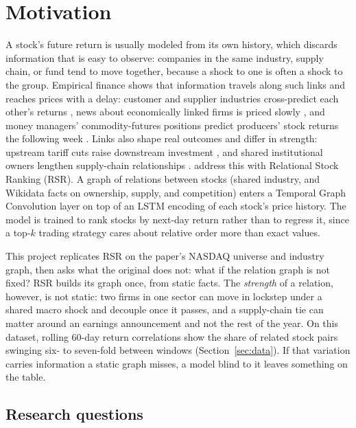 \documentclass[12pt]{article}
\begin{document}
\newpage
\clearpage


\section{Motivation}
\label{sec:motivation}

A stock's future return is usually modeled from its own history, which discards information that
is easy to observe: companies in the same industry, supply chain, or fund tend to move together,
because a shock to one is often a shock to the group. Empirical finance shows that information
travels along such links and reaches prices with a delay: customer and supplier industries
cross-predict each other's returns \citep{menzly2010market}, news about economically linked firms
is priced slowly \citep{cohen2008economic}, and money managers' commodity-futures positions predict
producers' stock returns the following week \citep{ho2023smart}. Links also shape real outcomes and
differ in strength: upstream tariff cuts raise downstream investment
\citep{martin2024downstream}, and shared institutional owners lengthen supply-chain relationships
\citep{freeman2025overlapping}. \citet{feng2019temporal} address this with
Relational Stock Ranking (RSR). A graph of relations between stocks (shared industry, and
Wikidata facts on ownership, supply, and competition) enters a Temporal Graph Convolution layer on
top of an LSTM encoding of each stock's price history. The model is trained to rank stocks by
next-day return rather than to regress it, since a top-$k$ trading strategy cares about relative
order more than exact values.

This project replicates RSR on the paper's NASDAQ universe and industry graph, then asks what the
original does not: what if the relation graph is not fixed? RSR builds its graph once, from
static facts. The \emph{strength} of a relation, however, is not static: two firms in one sector
can move in lockstep under a shared macro shock and decouple once it passes, and a supply-chain
tie can matter around an earnings announcement and not the rest of the year. On this dataset,
rolling 60-day return correlations show the share of related stock pairs swinging six- to
seven-fold between windows (Section~\ref{sec:data}). If that variation carries information a
static graph misses, a model blind to it leaves something on the table.

\subsection{Research questions}
\end{document}
